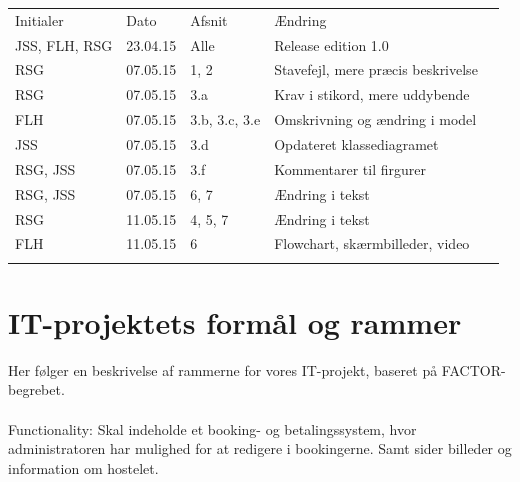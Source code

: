 \documentclass[12pt,a4paper]{article}
\begin{document}
\begin{table}[h]
\begin{tabular}{lllll}
\cline{1-4}
\multicolumn{1}{|l|}{Initialer} & \multicolumn{1}{l|}{Dato} & \multicolumn{1}{l|}{Afsnit} & \multicolumn{1}{l|}{Ændring} &  \\ \cline{1-4}
\multicolumn{1}{|l|}{JSS, FLH, RSG}     & \multicolumn{1}{l|}{23.04.15}     & \multicolumn{1}{l|}{Alle}       & \multicolumn{1}{l|}{Release edition 1.0}        &  \\ \cline{1-4}
\multicolumn{1}{|l|}{RSG}     & \multicolumn{1}{l|}{07.05.15}     & \multicolumn{1}{l|}{1, 2}       & \multicolumn{1}{l|}{Stavefejl, mere præcis beskrivelse}        &  \\ \cline{1-4}
\multicolumn{1}{|l|}{RSG}     & \multicolumn{1}{l|}{07.05.15}     & \multicolumn{1}{l|}{3.a}       & \multicolumn{1}{l|}{Krav i stikord, mere uddybende}        &  \\ \cline{1-4}
\multicolumn{1}{|l|}{FLH}     & \multicolumn{1}{l|}{07.05.15}     & \multicolumn{1}{l|}{3.b, 3.c, 3.e}       & \multicolumn{1}{l|}{Omskrivning og ændring i model}        &  \\ \cline{1-4}
\multicolumn{1}{|l|}{JSS}     & \multicolumn{1}{l|}{07.05.15}     & \multicolumn{1}{l|}{3.d}       & \multicolumn{1}{l|}{Opdateret klassediagramet}        &  \\ \cline{1-4}
\multicolumn{1}{|l|}{RSG, JSS}     & \multicolumn{1}{l|}{07.05.15}     & \multicolumn{1}{l|}{3.f}       & \multicolumn{1}{l|}{Kommentarer til firgurer}        &  \\ \cline{1-4}
\multicolumn{1}{|l|}{RSG, JSS}     & \multicolumn{1}{l|}{07.05.15}     & \multicolumn{1}{l|}{6, 7}       & \multicolumn{1}{l|}{Ændring i tekst}        &  \\ \cline{1-4}
\multicolumn{1}{|l|}{RSG}     & \multicolumn{1}{l|}{11.05.15}     & \multicolumn{1}{l|}{4, 5, 7}       & \multicolumn{1}{l|}{Ændring i tekst}        &  \\ \cline{1-4}
\multicolumn{1}{|l|}{FLH}     & \multicolumn{1}{l|}{11.05.15}     & \multicolumn{1}{l|}{6}       & \multicolumn{1}{l|}{Flowchart, skærmbilleder, video}        &  \\ \cline{1-4}
                           &                           &                             &                              & 
\end{tabular}
\end{table}


\newpage
\section{IT-projektets formål og rammer}
Her følger en beskrivelse af rammerne for vores IT-projekt, baseret på FACTOR-begrebet.
\\\\
Functionality: Skal indeholde et booking- og betalingssystem, hvor administratoren har mulighed for at redigere i bookingerne. Samt sider billeder og information om hostelet. \\
\end{document}

